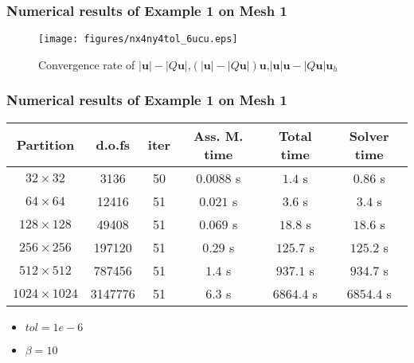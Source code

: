 \documentclass[notheorems,serif]{beamer}
\begin{document}
\begin{frame}
\frametitle{Numerical results of Example 1 on Mesh 1}
\begin{figure}[H] 
\centering 
\texttt{[image: figures/nx4ny4tol\_6ucu.eps]} 
\caption{Convergence rate of $\left|\boldsymbol{u}\right|-\left|Q\boldsymbol{u}\right|$,$(\left|\boldsymbol{u}\right|-\left|Q\boldsymbol{u}\right|)\boldsymbol{u}$,$\left|\boldsymbol{u}\right|\boldsymbol{u}-\left|Q\boldsymbol{u}\right|\boldsymbol{u}_h$} 
\label{fig:normumesh1p1} 
\end{figure}
\end{frame}

\begin{frame}
\frametitle{Numerical results of Example 1 on Mesh 1}
\begin{tabular}{ |c|c|c|c|c|c| }   
\hline   
Partition & d.o.fs & iter & Ass. M. time & Total time & Solver time \\
\hline
$32\times 32$ & 3136 & 50 & $0.0088$ s & $1.4$ s & $0.86$ s  \\
$64\times 64$ & 12416 & 51 & $0.021$ s & $3.6$ s & $3.4$ s  \\
$128\times 128$ & 49408 & 51 & $0.069$ s & $18.8$ s & $18.6$ s  \\
$256\times 256$ & 197120 & 51 & $0.29$ s & $125.7$ s & $125.2$ s  \\
$512\times 512$ & 787456 & 51 & $1.4$ s & $937.1$ s & $934.7$ s  \\
$1024\times 1024$ & 3147776 & 51 & $6.3$ s & $6864.4$ s & $6854.4$ s  \\
\hline 
\end{tabular}
\smallskip
\begin{itemize}
\item $tol = 1e-6$
\item $\beta = 10$
\end{itemize}
\end{frame}
\end{document}

